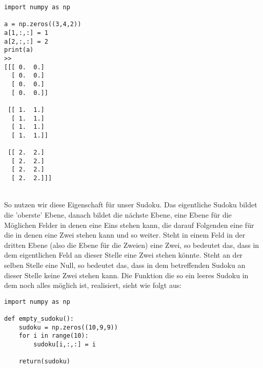 \documentclass[11pt,a4paper]{article}
\begin{document}
\begin{verbatim}
import numpy as np

a = np.zeros((3,4,2))
a[1,:,:] = 1
a[2,:,:] = 2
print(a)
>> 
[[[ 0.  0.]
  [ 0.  0.]
  [ 0.  0.]
  [ 0.  0.]]

 [[ 1.  1.]
  [ 1.  1.]
  [ 1.  1.]
  [ 1.  1.]]

 [[ 2.  2.]
  [ 2.  2.]
  [ 2.  2.]
  [ 2.  2.]]]
\end{verbatim}
\ \\
So nutzen wir diese Eigenschaft für unser Sudoku. Das eigentliche Sudoku bildet die 'oberste' Ebene, danach bildet die nächste Ebene, eine Ebene für die Möglichen Felder in denen eine Eins stehen kann, die darauf Folgenden eine für die in denen eine Zwei stehen kann und so weiter. Steht in einem Feld in der dritten Ebene (also die Ebene für die Zweien) eine Zwei, so bedeutet das, dass in dem eigentlichen Feld an dieser Stelle eine Zwei stehen könnte. Steht an der selben Stelle eine Null, so bedeutet das, dass in dem betreffenden Sudoku an dieser Stelle keine Zwei stehen kann. Die Funktion die so ein leeres Sudoku in dem noch alles möglich ist, realisiert, sieht wie folgt aus:  
\ \\
\begin{verbatim}
import numpy as np       

def empty_sudoku():              
    sudoku = np.zeros((10,9,9))
    for i in range(10):
        sudoku[i,:,:] = i
    
    return(sudoku)
\end{verbatim}
\ \\
\newpage
\ \\
\end{document}
